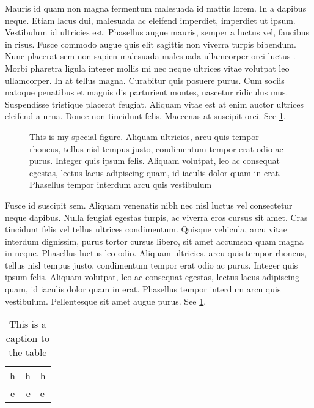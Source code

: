 Mauris id quam non magna fermentum malesuada id mattis lorem. In a dapibus neque. Etiam lacus dui, malesuada ac eleifend imperdiet, imperdiet ut ipsum. Vestibulum id ultricies est. Phasellus augue mauris, semper a luctus vel, faucibus in risus. Fusce commodo augue quis elit sagittis non viverra turpis bibendum. Nunc placerat sem non sapien malesuada malesuada ullamcorper orci luctus \cite{adams1980hitchhiker}. Morbi pharetra ligula integer mollis mi nec neque ultrices vitae volutpat leo ullamcorper. In at tellus magna. Curabitur quis posuere purus. Cum sociis natoque penatibus et magnis dis parturient montes, nascetur ridiculus mus. Suspendisse tristique placerat feugiat. Aliquam vitae est at enim auctor ultrices eleifend a urna. Donec non tincidunt felis. Maecenas at suscipit orci. See \cref{myFigure}.
\begin{figure}
    \centering
        \missingfigure[figwidth=6cm]{}
    \caption[Short caption to special figure]{This is my special figure. Aliquam ultricies, arcu quis tempor rhoncus, tellus nisl tempus justo, condimentum tempor erat odio ac purus. Integer quis ipsum felis. Aliquam volutpat, leo ac consequat egestas, lectus lacus adipiscing quam, id iaculis dolor quam in erat. Phasellus tempor interdum arcu quis vestibulum}
    \label{myFigure}
\end{figure}

Fusce id suscipit sem. Aliquam venenatis nibh nec nisl luctus vel consectetur neque dapibus. Nulla feugiat egestas turpis, ac viverra eros cursus sit amet. Cras tincidunt felis vel tellus ultrices condimentum. Quisque vehicula, arcu vitae interdum dignissim, purus tortor cursus libero, sit amet accumsan quam magna in neque. Phasellus luctus leo odio. Aliquam ultricies, arcu quis tempor rhoncus, tellus nisl tempus justo, condimentum tempor erat odio ac purus. Integer quis ipsum felis. Aliquam volutpat, leo ac consequat egestas, lectus lacus adipiscing quam, id iaculis dolor quam in erat. Phasellus tempor interdum arcu quis vestibulum. Pellentesque sit amet augue purus. See \cref{myTable}.

\begin{table}
    \caption{This is a caption to the table}
    \centering
        \begin{tabular}{c | r l}
            h & h & h \\
            e & e & e \\
        \end{tabular}
    \label{myTable}
\end{table}

